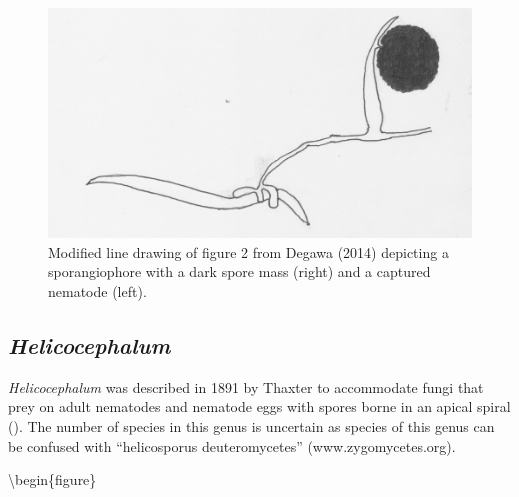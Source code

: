 \documentclass[]{book}
\begin{document}
\begin{figure}

{\centering \includegraphics[width=12.99in]{img/Ch3_Fig7} 

}

\caption{Modified line drawing of figure 2 from Degawa (2014) depicting a sporangiophore with a dark spore mass (right) and a captured nematode (left).}\label{fig:ch3fig7}
\end{figure}

\hypertarget{helicocephalum}{%
\subsection{\texorpdfstring{\emph{Helicocephalum}}{Helicocephalum}}\label{helicocephalum}}

\emph{Helicocephalum} was described in 1891 by Thaxter to accommodate fungi that prey on adult nematodes and nematode eggs with spores borne in an apical spiral (\citet{Thaxter_1891}). The number of species in this genus is uncertain as species of this genus can be confused with ``helicosporus deuteromycetes'' (www.zygomycetes.org).

\textbackslash begin\{figure\}
\end{document}
